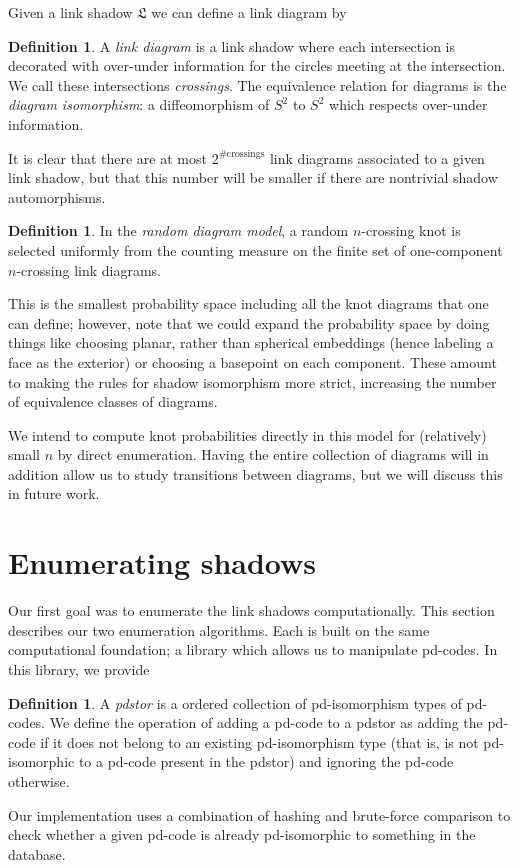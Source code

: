 \documentclass[amsmath,secnumarabic,floatfix,amssymb,nofootinbib,nobibnotes,letterpaper,11pt,tightenlines,showkeys]{revtex4}
\theoremstyle{definition}
\newtheorem{definition}[theorem]{Definition}
\let\mgp=\marginpar \marginparwidth18mm \marginparsep1mm
\def\marginpar#1{\mgp{\raggedright\tiny #1}}
\let\lbl=\label
\def\label#1{\lbl{#1}\ifinner\else\marginpar{\ref{#1} #1}\ignorespaces\fi}
\begin{document}
Given a link shadow $\mathfrak{L}$ we can define a link diagram by
\begin{definition}
A \emph{link diagram} is a link shadow where each intersection is decorated with over-under information for the circles meeting at the intersection. We call these intersections \emph{crossings}. The equivalence relation for diagrams is the \emph{diagram isomorphism}: a diffeomorphism of $S^2$ to $S^2$ which respects over-under information.
\end{definition}
It is clear that there are at most $2^{\text{\# crossings}}$ link diagrams associated to a given link shadow, but that this number will be smaller if there are nontrivial shadow automorphisms.
\begin{definition}
In the \emph{random diagram model}, a random $n$-crossing knot is selected uniformly from the counting measure on the finite set of one-component $n$-crossing link diagrams.
\end{definition}
This is the smallest probability space including all the knot diagrams that one can define; however, note that we could expand the probability space by doing things like choosing planar, rather than spherical embeddings (hence labeling a face as the exterior) or choosing a basepoint on each component. These amount to making the rules for shadow isomorphism more strict, increasing the number of equivalence classes of diagrams. 

We intend to compute knot probabilities directly in this model for (relatively) small $n$ by direct enumeration. Having the entire collection of diagrams will in addition allow us to study transitions between diagrams, but we will discuss this in future work.

\section{Enumerating shadows}

Our first goal was to enumerate the link shadows computationally. This section describes our two enumeration algorithms. Each is built on the same computational foundation; a library which allows us to manipulate pd-codes. In this library, we provide 
\begin{definition}
A \emph{pdstor} is a ordered collection of pd-isomorphism types of pd-codes. We define the operation of adding a pd-code to a pdstor as adding the pd-code if it does not belong to an existing pd-isomorphism type (that is, is not pd-isomorphic to a pd-code present in the pdstor) and ignoring the pd-code otherwise.
\label{def:pdstor}
\end{definition}
Our implementation uses a combination of hashing and brute-force comparison to check whether a given pd-code is already pd-isomorphic to something in the database. 
\end{document}
